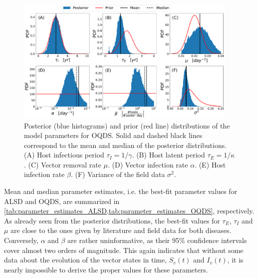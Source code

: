 \begin{figure}[H]
    \centering

    \includegraphics[width=0.95\textwidth]{Figures/Parameter_estimates_OQDS.pdf}
    \caption{Posterior (blue histograms) and prior (red line) distributions
        of the model parameters for OQDS. Solid and dashed black lines
        correspond to
        the mean and median of the posterior distributions. (A) Host infectious
        period
        $\tau_I=1/\gamma$. (B) Host latent period $\tau_E=1/\kappa$. (C) Vector
        removal
        rate $\mu$. (D) Vector infection rate $\alpha$. (E) Host infection rate
        $\beta$. (F) Variance of the field data $\sigma^2$.}
    \label{fig:parameter_estimates_OQDS}
\end{figure}

Mean and median parameter estimates, i.e. the best-fit parameter values for
ALSD and OQDS, are summarized in
\cref{tab:parameter_estimates_ALSD,tab:parameter_estimates_OQDS}, respectively.
As already seen from the posterior distributions, the best-fit values for
$\tau_E$, $\tau_I$ and $\mu$ are close to the ones given by literature and
field data for both diseases. Conversely, $\alpha$ and $\beta$ are rather
uninformative, as their 95\% confidence intervals cover almost two orders of
magnitude. This again indicates that without some data about the evolution of
the vector states in time, $S_v(t)$ and $I_v(t)$, it is nearly impossible to
derive the proper values for these parameters.

